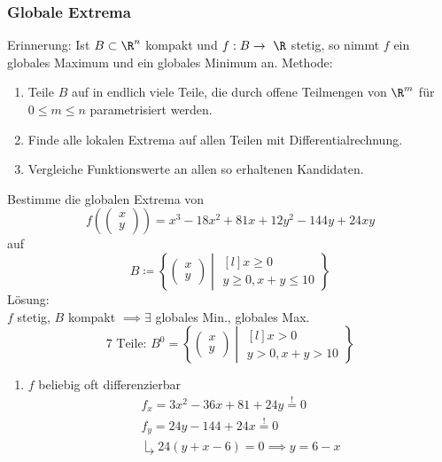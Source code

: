 \subsubsection{Globale Extrema}
Erinnerung: Ist $B \subset \R^n$ kompakt und $f: B \rightarrow \R$ stetig, so nimmt $f$ ein globales Maximum und ein globales Minimum an.
Methode:
\begin{enumerate}[label = (\alph*)]
	\item Teile $B$ auf in endlich viele Teile, die durch offene Teilmengen von $\R^m$ für $0 \leq m \leq n$ parametrisiert werden.
	\item Finde alle lokalen Extrema auf allen Teilen mit Differentialrechnung.
	\item Vergleiche Funktionswerte an allen so erhaltenen Kandidaten.
\end{enumerate}
\begin{bsp*}
	Bestimme die globalen Extrema von
	\[ f\left(\begin{pmatrix} x \\ y \end{pmatrix}\right) = x^3 - 18x^2 + 81x + 12y^2 - 144y + 24xy \]
	auf
	\[ B \coloneqq \left\{ \begin{pmatrix} x \\ y \end{pmatrix} \middle| \begin{matrix*}[l] x \geq 0 \\ y \geq 0 , x + y \leq 10 \end{matrix*} \right\} \]
	Lösung: \\
	$f$ stetig, $B$ kompakt $\implies \exists$ globales Min., globales Max.
	\[ 7 \text{ Teile: } B^0 = \left\{ \begin{pmatrix} x \\ y \end{pmatrix} \middle| \begin{matrix*}[l] x > 0 \\ y > 0 , x + y > 10 \end{matrix*} \right\} \]
	\begin{enumerate}[label = (\alph*)]
		\item $f$ beliebig oft differenzierbar
			\begin{gather*}
				f_x = 3x^2 - 36x + 81 + 24y \overset{!}{=} 0 \\
				f_y = 24y - 144 + 24x \overset{!}{=} 0 \\
				\drsh 24(y + x - 6) = 0 \implies y = 6 - x \\
				\begin{split}

\end{split}
\end{gather*}
\end{enumerate}
\end{bsp*}
